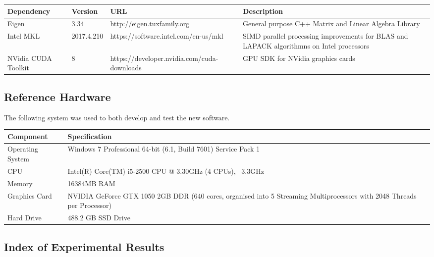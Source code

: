 \documentclass[a4paper]{amsart}
\begin{document}
 \begin{center}
 \begin{tabular}{|p{2cm}|p{2cm}|p{4cm}|p{4cm}|} 
 \hline
 Dependency & Version & URL & Description \\ [0.5ex] 
 \hline\hline
 Eigen\label{Eigen} & 3.34 &  http://eigen.tuxfamily.org & General purpose C++ Matrix and Linear Algebra Library \\ 
 \hline
 Intel MKL & 2017.4.210 & https://software.intel.com/en-us/mkl & SIMD parallel processing improvements for BLAS and LAPACK algorithmns on Intel processors \\
 \hline
NVidia CUDA Toolkit & 8 & https://developer.nvidia.com/cuda-downloads & GPU SDK for NVidia graphics cards  \\ [1ex] 
 \hline
\end{tabular}
\end{center}


\subsection{Reference Hardware}\label{refH}

The following system was used to both develop and test the new software.\\
 \begin{center}
 \begin{tabular}{|p{2cm}|p{8cm}|} 
 \hline
Component & Specification \\ [0.5ex] 
 \hline\hline
Operating System & Windows 7 Professional 64-bit (6.1, Build 7601) Service Pack 1 \\ 
 \hline
CPU & Intel(R) Core(TM) i5-2500 CPU @ 3.30GHz (4 CPUs), ~3.3GHz \\
 \hline
Memory & 16384MB RAM  \\ 
 \hline
Graphics Card & NVIDIA GeForce GTX 1050 2GB DDR (640 cores, organised into 5 Streaming Multiprocessors with 2048 Threads per Processor)  \\ 
 \hline
Hard Drive & 488.2 GB SSD Drive  \\ [1ex] 
 \hline
\end{tabular}
\end{center}

\subsection{Index of Experimental Results}
\end{document}
